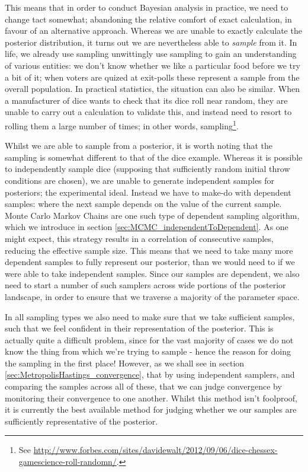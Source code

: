\documentclass[11pt,fullpage]{book}
\begin{document}
This means that in order to conduct Bayesian analysis in practice, we need to change tact somewhat; abandoning the relative comfort of exact calculation, in favour of an alternative approach. Whereas we are unable to exactly calculate the posterior distribution, it turns out we are nevertheless able to \textit{sample} from it. In life, we already use sampling unwittingly use sampling to gain an understanding of various entities: we don't know whether we like a particular food before we try a bit of it; when voters are quized at exit-polls these represent a sample from the overall population. In practical statistics, the situation can also be similar. When a manufacturer of dice wants to check that its dice roll near random, they are unable to carry out a calculation to validate this, and instead need to resort to rolling them a large number of times; in other words, sampling\footnote{See \url{http://www.forbes.com/sites/davidewalt/2012/09/06/dice-chessex-gamescience-roll-randomn/}.}. 

Whilst we are able to sample from a posterior, it is worth noting that the sampling is somewhat different to that of the dice example. Whereas it is possible to independently sample dice (supposing that sufficiently random initial throw conditions are chosen), we are unable to generate independent samples for posteriors; the experimental ideal. Instead we have to make-do with dependent samples: where the next sample depends on the value of the current sample. Monte Carlo Markov Chains are one such type of dependent sampling algorithm, which we introduce in section \ref{sec:MCMC_independentToDependent}. As one might expect, this strategy results in a correlation of consecutive samples, reducing the effective sample size. This means that we need to take many more dependent samples to fully represent our posterior, than we would need to if we were able to take independent samples. Since our samples are dependent, we also need to start a number of such samplers across wide portions of the posterior landscape, in order to ensure that we traverse a majority of the parameter space.

In all sampling types we also need to make sure that we take sufficient samples, such that we feel confident in their representation of the posterior. This is actually quite a difficult problem, since for the vast majority of cases we do not know the thing from which we're trying to sample - hence the reason for doing the sampling in the first place! However, as we shall see in section \ref{sec:MetropolisHastings_convergence}, that by using independent samplers, and comparing the samples across all of these, that we can judge convergence by monitoring their convergence to one another. Whilst this method isn't foolproof, it is currently the best available method for judging whether we our samples are sufficiently representative of the posterior.
\end{document}
